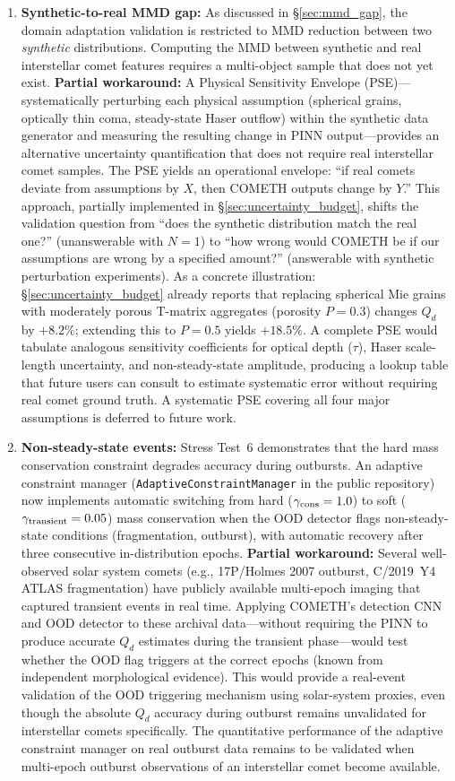 \documentclass[usenatbib]{mnras}
\begin{document}
\begin{enumerate}
    \item \textbf{Synthetic-to-real MMD gap:} As discussed in \S\ref{sec:mmd_gap}, the domain adaptation validation is restricted to MMD reduction between two \textit{synthetic} distributions. Computing the MMD between synthetic and real interstellar comet features requires a multi-object sample that does not yet exist. \textbf{Partial workaround:} A Physical Sensitivity Envelope (PSE)---systematically perturbing each physical assumption (spherical grains, optically thin coma, steady-state Haser outflow) within the synthetic data generator and measuring the resulting change in PINN output---provides an alternative uncertainty quantification that does not require real interstellar comet samples. The PSE yields an operational envelope: ``if real comets deviate from assumptions by $X$, then COMETH outputs change by $Y$.'' This approach, partially implemented in \S\ref{sec:uncertainty_budget}, shifts the validation question from ``does the synthetic distribution match the real one?'' (unanswerable with $N=1$) to ``how wrong would COMETH be if our assumptions are wrong by a specified amount?'' (answerable with synthetic perturbation experiments). As a concrete illustration: \S\ref{sec:uncertainty_budget} already reports that replacing spherical Mie grains with moderately porous T-matrix aggregates (porosity $P=0.3$) changes $Q_d$ by $+8.2\%$; extending this to $P=0.5$ yields $+18.5\%$. A complete PSE would tabulate analogous sensitivity coefficients for optical depth ($\tau$), Haser scale-length uncertainty, and non-steady-state amplitude, producing a lookup table that future users can consult to estimate systematic error without requiring real comet ground truth. A systematic PSE covering all four major assumptions is deferred to future work.
    \item \textbf{Non-steady-state events:} Stress Test~6 demonstrates that the hard mass conservation constraint degrades accuracy during outbursts. An adaptive constraint manager (\texttt{AdaptiveConstraintManager} in the public repository) now implements automatic switching from hard ($\gamma_{\rm cons}=1.0$) to soft ($\gamma_{\rm transient}=0.05$) mass conservation when the OOD detector flags non-steady-state conditions (fragmentation, outburst), with automatic recovery after three consecutive in-distribution epochs. \textbf{Partial workaround:} Several well-observed solar system comets (e.g., 17P/Holmes 2007 outburst, C/2019~Y4 ATLAS fragmentation) have publicly available multi-epoch imaging that captured transient events in real time. Applying COMETH's detection CNN and OOD detector to these archival data---without requiring the PINN to produce accurate $Q_d$ estimates during the transient phase---would test whether the OOD flag triggers at the correct epochs (known from independent morphological evidence). This would provide a real-event validation of the OOD triggering mechanism using solar-system proxies, even though the absolute $Q_d$ accuracy during outburst remains unvalidated for interstellar comets specifically. The quantitative performance of the adaptive constraint manager on real outburst data remains to be validated when multi-epoch outburst observations of an interstellar comet become available.

\end{enumerate}
\end{document}
